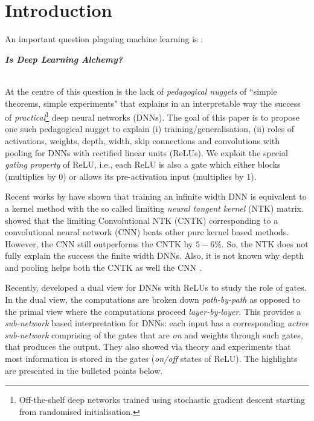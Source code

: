 \section{Introduction}\label{sec:intro}
An important question plaguing machine learning is \citet{BenAli-1,Lecun,BenAli-2,Aliresponse,Mickens}:\\
{\centerline{\textbf{\emph{Is Deep Learning Alchemy?}}}}\\
At the centre of this question is the lack of \emph{pedagogical nuggets} of ``simple theorems, simple experiments" \cite{Aliresponse} that explains in an interpretable way the success of \emph{practical}\footnote{Off-the-shelf deep networks trained using stochastic gradient descent starting from randomised initialisation.} deep neural networks (DNNs). The goal of this paper is to propose one such pedagogical nugget to explain (i) training/generalisation, (ii) roles of activations, weights, depth, width, skip connections and convolutions with pooling for DNNs with rectified linear units (ReLUs). We exploit the special \emph{gating property} of ReLU, i.e., each ReLU is also a gate which either blocks (multiplies by $0$) or allows its pre-activation input (multiplies by $1$). 

Recent works by \citet{arora2019exact, ntk,cao2019generalization} have shown that training an infinite width DNN is equivalent to a kernel method with the so called limiting \emph{neural tangent kernel} (NTK) matrix. \citet{arora2019exact} showed that the limiting Convolutional NTK (CNTK) corresponding to a convolutional neural network (CNN) beats other pure kernel based methods. However, the CNN still outperforms the CNTK by $5-6\%$. So, the NTK does not fully explain the success the finite width DNNs. Also, it is not known why depth and pooling helps both the CNTK as well the CNN \cite{arora2019exact}.

Recently, \citet{npk} developed a dual view for DNNs with ReLUs to study the role of gates. In the dual view, the computations are broken down \emph{path-by-path} as opposed to the primal view where the computations proceed \emph{layer-by-layer}. This provides a \emph{sub-network} based interpretation for DNNs: each input has a corresponding \emph{active sub-network} comprising of the gates that are \emph{on} and weights through such gates, that produces the output. They also showed via theory and experiments that most information is stored in the gates (\emph{on/off} states of ReLU). The highlights are presented in the bulleted points below.

